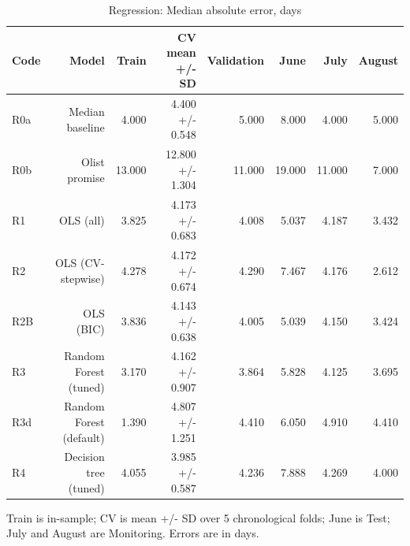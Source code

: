 \begin{table}[htbp]
\centering
\small
\caption{Regression: Median absolute error, days}
\begin{tabular}{lrrrrrrr}
\toprule
Code & Model & Train & CV mean +/- SD & Validation & June & July & August \\
\midrule
R0a & Median baseline & 4.000 & 4.400 +/- 0.548 & 5.000 & 8.000 & 4.000 & 5.000 \\
R0b & Olist promise & 13.000 & 12.800 +/- 1.304 & 11.000 & 19.000 & 11.000 & 7.000 \\
R1 & OLS (all) & 3.825 & 4.173 +/- 0.683 & 4.008 & 5.037 & 4.187 & 3.432 \\
R2 & OLS (CV-stepwise) & 4.278 & 4.172 +/- 0.674 & 4.290 & 7.467 & 4.176 & 2.612 \\
R2B & OLS (BIC) & 3.836 & 4.143 +/- 0.638 & 4.005 & 5.039 & 4.150 & 3.424 \\
R3 & Random Forest (tuned) & 3.170 & 4.162 +/- 0.907 & 3.864 & 5.828 & 4.125 & 3.695 \\
R3d & Random Forest (default) & 1.390 & 4.807 +/- 1.251 & 4.410 & 6.050 & 4.910 & 4.410 \\
R4 & Decision tree (tuned) & 4.055 & 3.985 +/- 0.587 & 4.236 & 7.888 & 4.269 & 4.000 \\
\bottomrule
\end{tabular}
\par\smallskip\begin{minipage}{\linewidth}\footnotesize Train is in-sample; CV is mean +/- SD over 5 chronological folds; June is Test; July and August are Monitoring. Errors are in days.\end{minipage}
\end{table}


